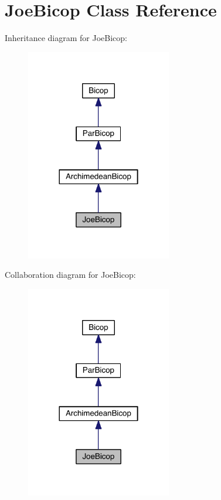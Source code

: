\hypertarget{class_joe_bicop}{}\section{Joe\+Bicop Class Reference}
\label{class_joe_bicop}


Inheritance diagram for Joe\+Bicop\+:
\nopagebreak
\begin{figure}[H]
\begin{center}
\leavevmode
\includegraphics[width=180pt]{class_joe_bicop__inherit__graph}
\end{center}
\end{figure}


Collaboration diagram for Joe\+Bicop\+:
\nopagebreak
\begin{figure}[H]
\begin{center}
\leavevmode
\includegraphics[width=180pt]{class_joe_bicop__coll__graph}
\end{center}
\end{figure}

